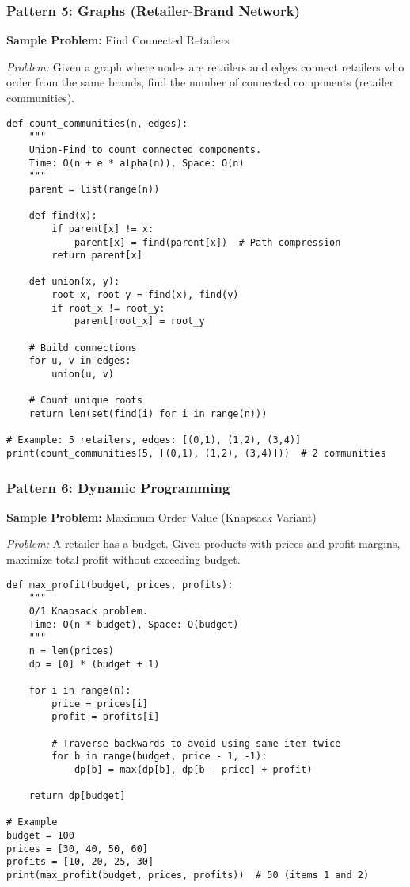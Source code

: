 \documentclass[11pt,letterpaper]{article}
\begin{document}
\subsubsection{Pattern 5: Graphs (Retailer-Brand Network)}

\textbf{Sample Problem:} Find Connected Retailers

\textit{Problem:} Given a graph where nodes are retailers and edges connect retailers who order from the same brands, find the number of connected components (retailer communities).

\begin{lstlisting}
def count_communities(n, edges):
    """
    Union-Find to count connected components.
    Time: O(n + e * alpha(n)), Space: O(n)
    """
    parent = list(range(n))

    def find(x):
        if parent[x] != x:
            parent[x] = find(parent[x])  # Path compression
        return parent[x]

    def union(x, y):
        root_x, root_y = find(x), find(y)
        if root_x != root_y:
            parent[root_x] = root_y

    # Build connections
    for u, v in edges:
        union(u, v)

    # Count unique roots
    return len(set(find(i) for i in range(n)))

# Example: 5 retailers, edges: [(0,1), (1,2), (3,4)]
print(count_communities(5, [(0,1), (1,2), (3,4)]))  # 2 communities
\end{lstlisting}

\subsubsection{Pattern 6: Dynamic Programming}

\textbf{Sample Problem:} Maximum Order Value (Knapsack Variant)

\textit{Problem:} A retailer has a budget. Given products with prices and profit margins, maximize total profit without exceeding budget.

\begin{lstlisting}
def max_profit(budget, prices, profits):
    """
    0/1 Knapsack problem.
    Time: O(n * budget), Space: O(budget)
    """
    n = len(prices)
    dp = [0] * (budget + 1)

    for i in range(n):
        price = prices[i]
        profit = profits[i]

        # Traverse backwards to avoid using same item twice
        for b in range(budget, price - 1, -1):
            dp[b] = max(dp[b], dp[b - price] + profit)

    return dp[budget]

# Example
budget = 100
prices = [30, 40, 50, 60]
profits = [10, 20, 25, 30]
print(max_profit(budget, prices, profits))  # 50 (items 1 and 2)
\end{lstlisting}
\end{document}
